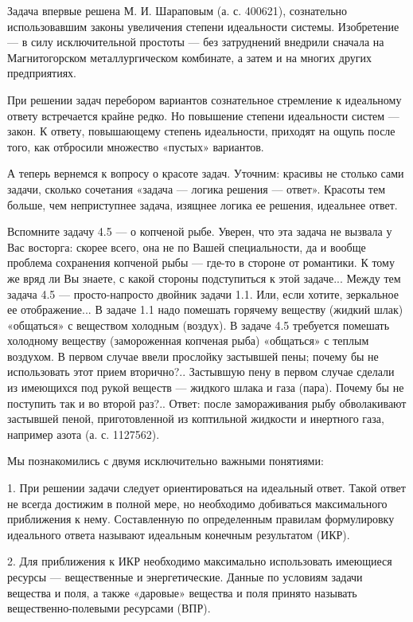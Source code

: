 Задача  впервые решена  М. И.  Шараповым (а.  с. 400621),  сознательно
использовавшим   законы   увеличения  степени   идеальности   системы.
Изобретение  —  в  силу  исключительной  простоты  —  без  затруднений
внедрили сначала на Магнитогорском металлургическом комбинате, а затем
и на многих других предприятиях.


При  решении  задач  перебором  вариантов  сознательное  стремление  к
идеальному  ответу  встречается  крайне редко.  Но  повышение  степени
идеальности систем — закон. К ответу, повышающему степень идеальности,
приходят  на  ощупь  после  того,  как  отбросили  множество  «пустых»
вариантов.


А  теперь вернемся  к вопросу  о  красоте задач.  Уточним: красивы  не
столько  сами задачи,  сколько сочетания  «задача —  логика решения  —
ответ». Красоты тем больше, чем неприступнее задача, изящнее логика ее
решения, идеальнее ответ.

Вспомните задачу  4.5 —  о копченой  рыбе. Уверен,  что эта  задача не
вызвала у Вас  восторга: скорее всего, она не  по Вашей специальности,
да и  вообще проблема сохранения копченой  рыбы — где-то в  стороне от
романтики. К тому же вряд ли Вы знаете, с какой стороны подступиться к
этой задаче... Между  тем задача 4.5 —  просто-напросто двойник задачи
1.1. Или, если хотите, зеркальное  ее отображение... В задаче 1.1 надо
помешать  горячему  веществу  (жидкий  шлак)  «общаться»  с  веществом
холодным (воздух). В задаче  4.5 требуется помешать холодному веществу
(замороженная копченая  рыба) «общаться»  с теплым воздухом.  В первом
случае ввели прослойку застывшей пены;  почему бы не использовать этот
прием вторично?.. Застывшую пену в  первом случае сделали из имеющихся
под  рукой  веществ —  жидкого  шлака  и  газа  (пара). Почему  бы  не
поступить  так и  во  второй раз?..  Ответ:  после замораживания  рыбу
обволакивают застывшей пеной, приготовленной  из коптильной жидкости и
инертного газа, например азота (а. с. 1127562).


Мы познакомились с двумя исключительно важными понятиями:

1.  При решении  задачи  следует ориентироваться  на идеальный  ответ.
Такой ответ не всегда достижим в полной мере, но необходимо добиваться
максимального  приближения   к  нему.  Составленную   по  определенным
правилам  формулировку идеального  ответа называют  идеальным конечным
результатом (ИКР).

2. Для приближения к ИКР необходимо максимально использовать имеющиеся
ресурсы  — вещественные  и энергетические.  Данные по  условиям задачи
вещества и  поля, а также  «даровые» вещества и поля  принято называть
вещественно-полевыми ресурсами (ВПР).

